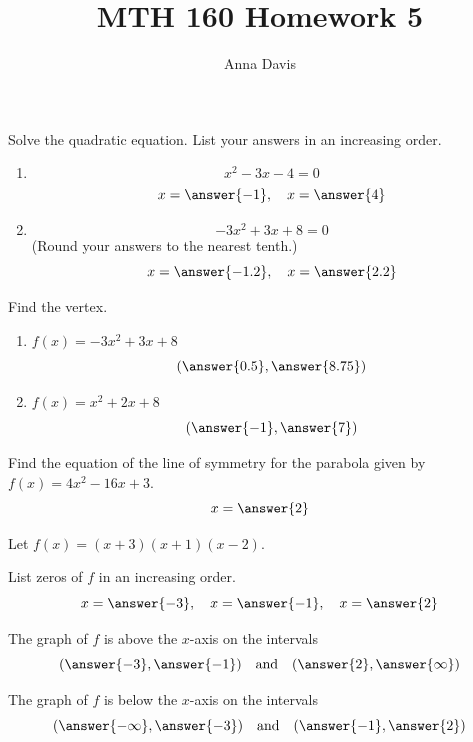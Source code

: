 \documentclass{ximera}
\author{Anna Davis} \title{MTH 160 Homework 5}
\begin{document}
\begin{abstract}

\end{abstract}
\maketitle

 
  \begin{problem}\label{prob:160hom5prob1} 
  Solve the quadratic equation.  List your answers in an increasing order.
  \begin{enumerate}
      \item $$x^2-3x-4=0$$
      $$x=\answer{-1},\quad x=\answer{4}$$
      \item $$-3x^2+3x+8=0$$ (Round your answers to the nearest tenth.)
      $$x=\answer{-1.2},\quad x=\answer{2.2}$$
  \end{enumerate}
  \end{problem}
  
  \begin{problem}\label{prob:160hom5prob2} 
  Find the vertex.
  \begin{enumerate}
      \item $f(x)=-3x^2+3x+8$
      $$(\answer{0.5},\answer{8.75})$$
      \item $f(x)=x^2+2x+8$
      $$(\answer{-1},\answer{7})$$
  \end{enumerate}
  \end{problem}
  
  \begin{problem}\label{prob:160hom5prob3} 
  Find the equation of the line of symmetry for the parabola given by $f(x)=4x^2-16x+3$.
  $$x=\answer{2}$$
  \end{problem}
  

  
  \begin{problem}\label{prob:160hom5prob5} 
  Let $f(x)=(x+3)(x+1)(x-2)$.  
  
  List zeros of $f$ in an increasing order.
  $$x=\answer{-3},\quad x=\answer{-1},\quad x=\answer{2}$$
  
  The graph of $f$ is above the $x$-axis on the intervals
  $$(\answer{-3},\answer{-1})\quad \mbox{and}\quad (\answer{2},\answer{\infty})$$
  
  The graph of $f$ is below the $x$-axis on the intervals
  $$(\answer{-\infty},\answer{-3})\quad \mbox{and}\quad (\answer{-1},\answer{2})$$
  \end{problem}
  
\end{document}
